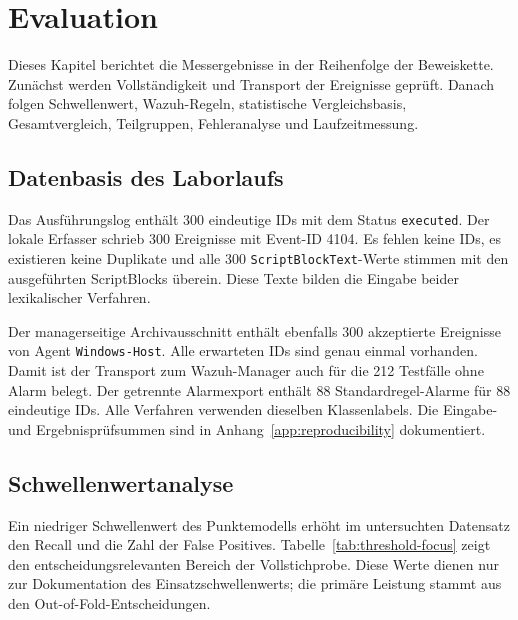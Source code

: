 \documentclass[12pt,a4paper,oneside,parskip=half]{scrreprt}
\begin{document}
\chapter{Evaluation}

Dieses Kapitel berichtet die Messergebnisse in der Reihenfolge der Beweiskette. Zunächst werden Vollständigkeit und Transport der Ereignisse geprüft. Danach folgen Schwellenwert, Wazuh-Regeln, statistische Vergleichsbasis, Gesamtvergleich, Teilgruppen, Fehleranalyse und Laufzeitmessung.

\section{Datenbasis des Laborlaufs}
Das Ausführungslog enthält 300 eindeutige IDs mit dem Status \texttt{executed}. Der lokale Erfasser schrieb 300 Ereignisse mit Event-ID 4104. Es fehlen keine IDs, es existieren keine Duplikate und alle 300 \texttt{ScriptBlockText}-Werte stimmen mit den ausgeführten ScriptBlocks überein. Diese Texte bilden die Eingabe beider lexikalischer Verfahren.

Der managerseitige Archivausschnitt enthält ebenfalls 300 akzeptierte Ereignisse von Agent \texttt{Windows-Host}. Alle erwarteten IDs sind genau einmal vorhanden. Damit ist der Transport zum Wazuh-Manager auch für die 212 Testfälle ohne Alarm belegt. Der getrennte Alarmexport enthält 88 Standardregel-Alarme für 88 eindeutige IDs. Alle Verfahren verwenden dieselben Klassenlabels. Die Eingabe- und Ergebnisprüfsummen sind in Anhang~\ref{app:reproducibility} dokumentiert.

\section{Schwellenwertanalyse}
Ein niedriger Schwellenwert des Punktemodells erhöht im untersuchten Datensatz den Recall und die Zahl der False Positives. Tabelle~\ref{tab:threshold-focus} zeigt den entscheidungsrelevanten Bereich der Vollstichprobe. Diese Werte dienen nur zur Dokumentation des Einsatzschwellenwerts; die primäre Leistung stammt aus den Out-of-Fold-Entscheidungen.
\end{document}
